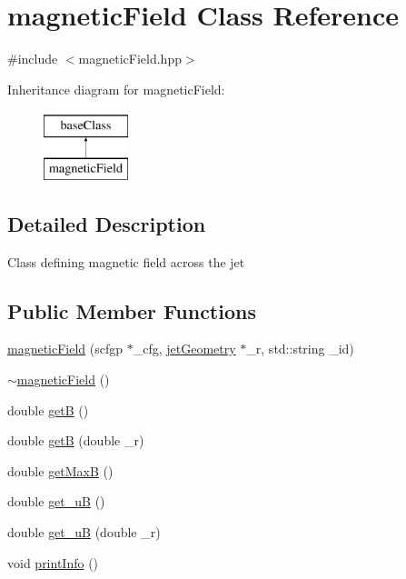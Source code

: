 \hypertarget{classmagneticField}{\section{magnetic\-Field Class Reference}
\label{classmagneticField}
}


{\ttfamily \#include $<$magnetic\-Field.\-hpp$>$}

Inheritance diagram for magnetic\-Field\-:\begin{figure}[H]
\begin{center}
\leavevmode
\includegraphics[height=2.000000cm]{classmagneticField}
\end{center}
\end{figure}


\subsection{Detailed Description}
Class defining magnetic field across the jet \subsection*{Public Member Functions}
\begin{DoxyCompactItemize}
\item 
\hyperlink{classmagneticField_ac856f6e43cc63fb2a16c0f013d70123b}{magnetic\-Field} (scfgp $\ast$\-\_\-cfg, \hyperlink{classjetGeometry}{jet\-Geometry} $\ast$\-\_\-r, std\-::string \-\_\-id)
\item 
\hyperlink{classmagneticField_a1d7c41029c88b3a2683d8e1bec376e16}{$\sim$magnetic\-Field} ()
\item 
double \hyperlink{classmagneticField_ac345cd6d5a111f0b96db08dadf65ff76}{get\-B} ()
\item 
double \hyperlink{classmagneticField_a24bacbdab7f8c280e0bcbbe8ff50e5eb}{get\-B} (double \-\_\-r)
\item 
double \hyperlink{classmagneticField_a3b573d12649137290d521539b903da8d}{get\-Max\-B} ()
\item 
double \hyperlink{classmagneticField_ad1184833ba01cf9ef3fdf4bbd5b6f7f9}{get\-\_\-u\-B} ()
\item 
double \hyperlink{classmagneticField_ad9d8d66260564c919d0fd253f4b3c60d}{get\-\_\-u\-B} (double \-\_\-r)
\item 
void \hyperlink{classmagneticField_a9a0793b3b3a94962aaea1052edfe9b28}{print\-Info} ()
\end{DoxyCompactItemize}
